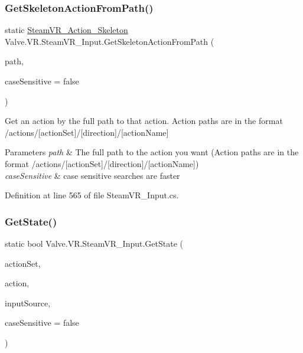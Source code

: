 \subsubsection{\texorpdfstring{GetSkeletonActionFromPath()}{GetSkeletonActionFromPath()}}
{\footnotesize\ttfamily static \mbox{\hyperlink{class_valve_1_1_v_r_1_1_steam_v_r___action___skeleton}{Steam\+V\+R\+\_\+\+Action\+\_\+\+Skeleton}} Valve.\+V\+R.\+Steam\+V\+R\+\_\+\+Input.\+Get\+Skeleton\+Action\+From\+Path (\begin{DoxyParamCaption}\item[{string}]{path,  }\item[{bool}]{case\+Sensitive = {\ttfamily false} }\end{DoxyParamCaption})\hspace{0.3cm}{\ttfamily [static]}}



Get an action by the full path to that action. Action paths are in the format /actions/\mbox{[}action\+Set\mbox{]}/\mbox{[}direction\mbox{]}/\mbox{[}action\+Name\mbox{]} 


\begin{DoxyParams}{Parameters}
{\em path} & The full path to the action you want (Action paths are in the format /actions/\mbox{[}action\+Set\mbox{]}/\mbox{[}direction\mbox{]}/\mbox{[}action\+Name\mbox{]})\\
\hline
{\em case\+Sensitive} & case sensitive searches are faster\\
\hline
\end{DoxyParams}


Definition at line 565 of file Steam\+V\+R\+\_\+\+Input.\+cs.

\mbox{\label{class_valve_1_1_v_r_1_1_steam_v_r___input_aca0c5b17c9729bd900e7132fa98b3a36}} 
\subsubsection{\texorpdfstring{GetState()}{GetState()}\hspace{0.1cm}{\footnotesize\ttfamily [1/2]}}
{\footnotesize\ttfamily static bool Valve.\+V\+R.\+Steam\+V\+R\+\_\+\+Input.\+Get\+State (\begin{DoxyParamCaption}\item[{string}]{action\+Set,  }\item[{string}]{action,  }\item[{\mbox{\hyperlink{namespace_valve_1_1_v_r_a82e5bf501cc3aa155444ee3f0662853f}{Steam\+V\+R\+\_\+\+Input\+\_\+\+Sources}}}]{input\+Source,  }\item[{bool}]{case\+Sensitive = {\ttfamily false} }\end{DoxyParamCaption})\hspace{0.3cm}{\ttfamily [static]}}




